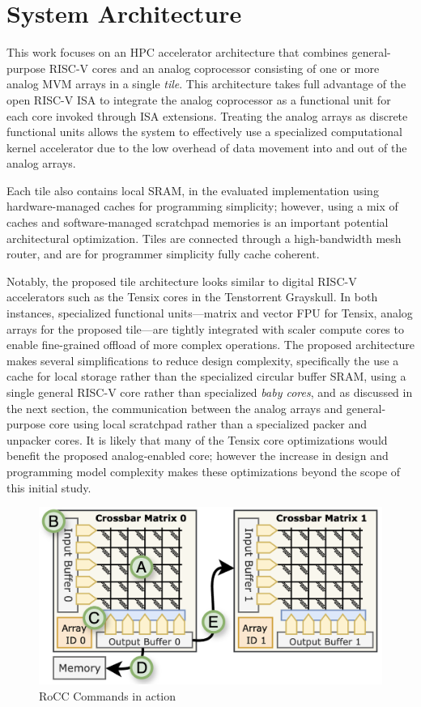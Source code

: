 \section{System Architecture}
This work focuses on an HPC accelerator architecture that combines general-purpose RISC-V cores and an analog coprocessor consisting of one or more analog MVM arrays in a single \emph{tile}.
This architecture takes full advantage of the open RISC-V ISA to integrate the analog coprocessor as a functional unit for each core invoked through ISA extensions.
Treating the analog arrays as discrete functional units allows the system to effectively use a specialized computational kernel accelerator due to the low overhead of data movement into and out of the analog arrays.

Each tile also contains local SRAM, in the evaluated implementation using hardware-managed caches for programming simplicity; however, using a mix of caches and software-managed scratchpad memories is an important potential architectural optimization.
Tiles are connected through a high-bandwidth mesh router, and are for programmer simplicity fully cache coherent.

Notably, the proposed tile architecture looks similar to digital RISC-V accelerators such as the Tensix cores in the Tenstorrent Grayskull. \cite{10820793} %
In both instances, specialized functional units---matrix and vector FPU for Tensix, analog arrays for the proposed tile---are tightly integrated with scaler compute cores to enable fine-grained offload of more complex operations.
The proposed architecture makes several simplifications to reduce design complexity, specifically the use a cache for local storage rather than the specialized circular buffer SRAM, using a single general RISC-V core rather than specialized \textit{baby cores}, and as discussed in the next section, the communication between the analog arrays and general-purpose core using local scratchpad rather than a specialized packer and unpacker cores.
It is likely that many of the Tensix core optimizations would benefit the proposed analog-enabled core; however the increase in design and programming model complexity makes these optimizations beyond the scope of this initial study.

\begin{figure}[ht]
    \centering
    \includegraphics[scale=0.42]{figures/compute_arrays.png}
    \caption{RoCC Commands in action}
    \label{fig:rocc_commands}
\end{figure}

